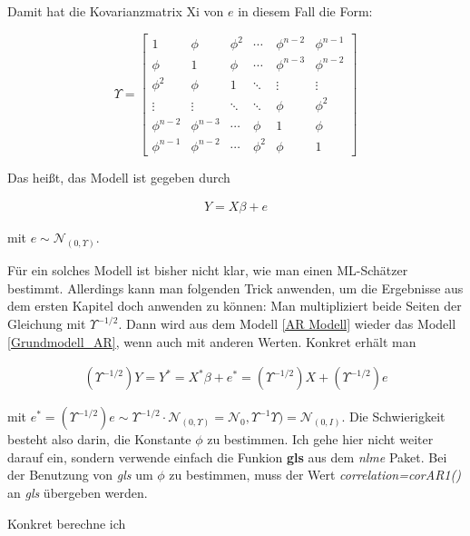 \documentclass[12pt,a4paper]{article}
\theoremstyle{definition}
\theoremstyle{definition}
\theoremstyle{definition}
\begin{document}
Damit hat die Kovarianzmatrix \gls{Xi} von $e$ in diesem Fall die Form:

\[
\Upsilon = 
\left[
   \begin{array}{cccccc}
     1 				& \phi 			& \phi^2	& \cdots	& \phi^{n-2}	& \phi^{n-1} 	\\
     \phi 			& 1		 		& \phi 		& \cdots	& \phi^{n-3}	& \phi^{n-2} 	\\
     \phi^2 		& \phi 			& 1		 	& \ddots	& \vdots		& \vdots 		\\
     \vdots		 	& \vdots	 	& \ddots	& \ddots	& \phi			& \phi^{2} 	\\
     \phi^{n-2} 	& \phi^{n-3}	& \cdots 	& \phi		& 1				& \phi 		\\
     \phi^{n-1} 	& \phi^{n-2} 	& \cdots	& \phi^{2}	& \phi			& 1  
   \end{array}
\right]
\]

Das heißt, das Modell ist gegeben durch 

\begin{align} \label{AR Modell}
Y = X \beta + e
\end{align}

mit $e \sim \mathscr{N}_(0,\Upsilon)$.

Für ein solches Modell ist bisher nicht klar, wie man einen ML-Schätzer bestimmt. Allerdings kann man folgenden Trick anwenden, um die Ergebnisse aus dem ersten Kapitel doch anwenden zu können: Man multipliziert beide Seiten der Gleichung mit $\Upsilon^{-1/2}$. Dann wird aus dem Modell \eqref{AR Modell} wieder das Modell \eqref{Grundmodell_AR}, wenn auch mit anderen Werten. Konkret erhält man

\begin{align} \label{AR rück}
(\Upsilon^{-1/2})Y = Y^{*} = X^{*} \beta + e^{*} = (\Upsilon^{-1/2})X + (\Upsilon^{-1/2})e
\end{align}

mit $e^{*} = (\Upsilon^{-1/2})e \sim \Upsilon^{-1/2} \cdot \mathscr{N}_(0,\Upsilon) = \mathscr{N}_0,\Upsilon^{-1}\Upsilon) = \mathscr{N}_(0,I)$. Die Schwierigkeit besteht also darin, die Konstante $\phi$ zu bestimmen. Ich gehe hier nicht weiter darauf ein, sondern verwende einfach die Funkion \textbf{gls} aus dem \textit{nlme} Paket. Bei der Benutzung von \textit{gls} um $\phi$ zu bestimmen, muss der Wert \textit{correlation=corAR1()} an \textit{gls} übergeben werden.

Konkret berechne ich 
\end{document}

